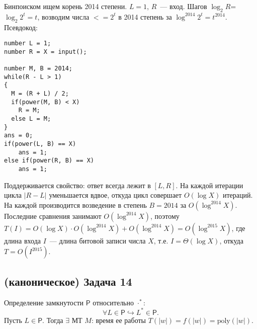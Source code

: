 \documentclass[a4paper]{article}
\def\PP{{\mathsf{P}}}
\begin{document}
Бинпоиском ищем корень 2014 степени. $L=1$, $R$~--- вход. Шагов $\log_{2} R$=$\log_2 2^t=t$, возводим числа $<= 2^t$ в 2014 степень за $\log^{2014} 2^t=t^{2014}$. Псевдокод:\newline
\begin{lstlisting}
number L = 1;
number R = X = input();

number M, B = 2014;
while(R - L > 1)
{
  M = (R + L) / 2;
  if(power(M, B) < X)
    R = M;
  else L = M;
}
ans = 0;
if(power(L, B) == X)
	ans = 1;
else if(power(R, B) == X)
	ans = 1;
\end{lstlisting}
Поддерживается свойство: ответ всегда лежит в $[L,R]$. На каждой итерации цикла $|R-L|$ уменьшается вдвое, откуда цикл совершает $O(\log X)$ итераций. На каждой производится возведение в степень $B=2014$ за $O(\log^{2014} X)$. Последние сравнения занимают $O(\log^{2014}X)$, поэтому $T(I)=O(\log X)\cdot O(\log^{2014}X)+O(\log^{2014}X)=O(\log^{2015} X)$, где длина входа $I$~--- длина битовой записи числа $X$, т.е. $I=\Theta(\log X)$, откуда $T=O(I^{2015})$.
\subsection*{(каноническое) Задача 14}
Определение замкнутости $\PP$ относительно $\cdot^*$:
$$
\forall L\in\PP\hookrightarrow L^*\in\PP.
$$
Пусть $L\in\PP$. Тогда $\exists$ МТ $M$: время ее работы $T(|w|)=f(|w|)=\mbox{poly}(|w|)$. 
\end{document}
